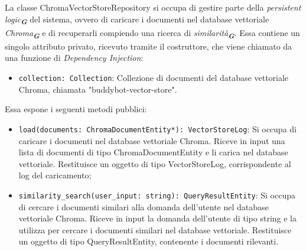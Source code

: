 \label{sec:chroma_vector_store_repository}
La classe ChromaVectorStoreRepository si occupa di gestire parte della \emph{persistent logic}\textsubscript{\textbf{\textit{G}}} del sistema, ovvero di caricare i documenti nel database vettoriale \emph{Chroma}\textsubscript{\textbf{\textit{G}}} e di recuperarli compiendo una ricerca di \emph{similarità}\textsubscript{\textbf{\textit{G}}}. Essa contiene un singolo attributo privato, ricevuto tramite il costruttore, che viene chiamato da una funzione di \emph{Dependency Injection}:
\begin{itemize}
    \item \texttt{collection: Collection}: Collezione di documenti del database vettoriale Chroma, chiamata "buddybot-vector-store".
\end{itemize}
Essa espone i seguenti metodi pubblici:
\begin{itemize}
    \item \texttt{load(documents: ChromaDocumentEntity*): VectorStoreLog}: Si occupa di caricare i documenti nel database vettoriale Chroma. Riceve in input una lista di documenti di tipo ChromaDocumentEntity e li carica nel database vettoriale. Restituisce un oggetto di tipo VectorStoreLog, corrispondente al log del caricamento;
    \item \texttt{similarity\_search(user\_input: string): QueryResultEntity}: Si occupa di cercare i documenti similari alla domanda dell'utente nel database vettoriale Chroma. Riceve in input la domanda dell'utente di tipo string e la utilizza per cercare i documenti similari nel database vettoriale. Restituisce un oggetto di tipo QueryResultEntity, contenente i documenti rilevanti.
\end{itemize}

